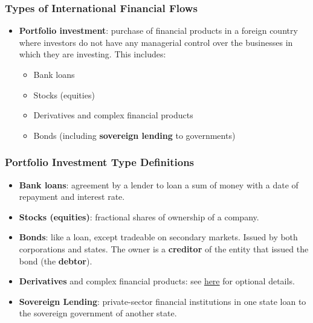 \documentclass{beamer}
\begin{document}
\begin{frame} 
	\frametitle{\LARGE{Types of International Financial Flows}}
	\begin{itemize}
			\item \textbf{Portfolio investment}: purchase of financial products in a foreign country where investors do not have any managerial control over the businesses in which they are investing. This includes: \pause 
			\begin{itemize}
			    \item Bank loans \pause 
			    \item Stocks (equities) \pause
			    \item Derivatives and complex financial products \pause 
			    \item Bonds (including \textbf{sovereign lending} to governments)   
			 \end{itemize}
	\end{itemize}
\end{frame}

\begin{frame} 
	\frametitle{\LARGE{Portfolio Investment Type Definitions}}
	\begin{itemize}
		\item \textbf{Bank loans}: agreement by a lender to loan a sum of money with a date of repayment and interest rate. \pause 
		\item \textbf{Stocks (equities)}: fractional shares of ownership of a company. \pause
		\item \textbf{Bonds}: like a loan, except tradeable on secondary markets. Issued by both corporations and states. The owner is a \textbf{creditor} of the entity that issued the bond (the \textbf{debtor}). \pause  
		\item \textbf{Derivatives} and complex financial products: see \href{https://www.investopedia.com/terms/d/derivative.asp}{here} for optional details. 
	 	\item \textbf{Sovereign Lending}: private-sector financial institutions in one state loan to the sovereign government of another state. 
	\end{itemize}
\end{frame}
\end{document}
